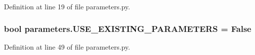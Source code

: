 Definition at line 19 of file parameters.\+py.

\subsubsection[{\texorpdfstring{U\+S\+E\+\_\+\+E\+X\+I\+S\+T\+I\+N\+G\+\_\+\+P\+A\+R\+A\+M\+E\+T\+E\+RS}{USE_EXISTING_PARAMETERS}}]{\setlength{\rightskip}{0pt plus 5cm}bool parameters.\+U\+S\+E\+\_\+\+E\+X\+I\+S\+T\+I\+N\+G\+\_\+\+P\+A\+R\+A\+M\+E\+T\+E\+RS = False}\hypertarget{namespaceparameters_a0cffcb215ac12a1700baedb1a13ec8d5}{}\label{namespaceparameters_a0cffcb215ac12a1700baedb1a13ec8d5}


Definition at line 49 of file parameters.\+py.

